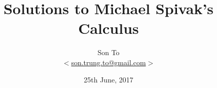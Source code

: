 \documentclass[a4paper,11pt]{memoir}
\newcommand{\note}[1]{\emph{#1}}
\theoremstyle{plain} \newtheorem{id}{Lemma}
\theoremstyle{definition} \newtheorem{pr}{Problem}[chapter]
\theoremstyle{remark}\newtheorem*{ab}{Remark}
\begin{document}
  \title{Solutions to Michael Spivak's Calculus}
  \author{Son To\\
  $<$\href{mailto:son.trung.to@gmail.com}%
  {son.trung.to@gmail.com}$>$}
  \date{25th June, 2017}

  \maketitle
  \makeatletter
  \def\cleardoublepage{\clearpage\if@twoside
  \ifodd\c@page\else
    \hbox{}
    \vspace*{\fill}
    \begin{center}
      \doublenote
    \end{center}
    \vspace*{\fill}
    \thispagestyle{empty}
    \newpage
    \if@twocolumn\hbox{}\newpage\fi\fi\fi
}
\newcommand{\mylabel}[2]{#2\def\@currentlabel{#2}\label{#1}}
\def\@endpart{\vfill\newpage
              \if@twoside
                \if@openright
                  \null
                  \thispagestyle{empty}%
\vspace*{\fill}%
\begin{quote}%
  \partnote
\end{quote}%
\vspace*{\fill}%
                  \newpage
                \fi
              \fi
              \if@tempswa
                \twocolumn
              \fi
}
\newcommand{\partnote}{}
\newcommand{\doublenote}{}

\newcommand\binomialCoefficient[2]{%
  \c@pgf@counta=#1 %
  \c@pgf@countb=#2 %
  \c@pgf@countc=\c@pgf@counta%
  \advance \c@pgf@countc by-\c@pgf@countb%
  \ifnum\c@pgf@countb>\c@pgf@countc%
    \c@pgf@countb=\c@pgf@countc%
  \fi%
  \c@pgf@countc=1 %
  \c@pgf@countd=0 %
  \pgfmathloop %
    \ifnum\c@pgf@countd<\c@pgf@countb%
    \multiply \c@pgf@countc by\c@pgf@counta%
    \advance  \c@pgf@counta by-1%
    \advance  \c@pgf@countd by1%
    \divide   \c@pgf@countc by\c@pgf@countd%
  \repeatpgfmathloop%
  \the\c@pgf@countc%
}
\makeatother

\renewcommand{\doublenote}{%
\note{To my mother, friends and all those who influence me.}}
\frontmatter
\end{document}
